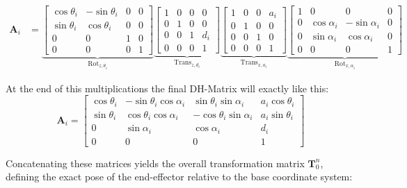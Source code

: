 \documentclass[11pt, a4paper]{article}
\begin{document}
\begin{align*}
\mathbf{A}_i &=\underbrace{
\begin{bmatrix} 
\cos\theta_i & -\sin\theta_i & 0 & 0 \\ 
\sin\theta_i & \cos\theta_i & 0 & 0 \\ 
0 & 0 & 1 & 0 \\ 
0 & 0 & 0 & 1 
\end{bmatrix}}_{\text{Rot}_{z, \theta_i}}
\underbrace{
\begin{bmatrix} 
1 & 0 & 0 & 0 \\ 
0 & 1 & 0 & 0 \\ 
0 & 0 & 1 & d_i \\ 
0 & 0 & 0 & 1 
\end{bmatrix}}_{\text{Trans}_{z, d_i}}
\underbrace{
\begin{bmatrix} 
1 & 0 & 0 & a_i \\ 
0 & 1 & 0 & 0 \\ 
0 & 0 & 1 & 0 \\ 
0 & 0 & 0 & 1 
\end{bmatrix}}_{\text{Trans}_{x, a_i}}
\underbrace{
\begin{bmatrix} 
1 & 0 & 0 & 0 \\ 
0 & \cos\alpha_i & -\sin\alpha_i & 0 \\ 
0 & \sin\alpha_i & \cos\alpha_i & 0 \\ 
0 & 0 & 0 & 1 
\end{bmatrix}}_{\text{Rot}_{x, \alpha_i}}
\end{align*}

At the end of this multiplications the final DH-Matrix will exactly like this:
\begin{equation}
    \mathbf{A}_i = \begin{bmatrix} \cos\theta_i & -\sin\theta_i \cos\alpha_i & \sin\theta_i \sin\alpha_i & a_i \cos\theta_i \\ \sin\theta_i & \cos\theta_i \cos\alpha_i & -\cos\theta_i \sin\alpha_i & a_i \sin\theta_i \\ 0 & \sin\alpha_i & \cos\alpha_i & d_i \\ 0 & 0 & 0 & 1 \end{bmatrix}
\end{equation}

\noindent Concatenating these matrices yields the overall transformation matrix $\mathbf{T}_0^n$, defining the exact pose of the end-effector relative to the base coordinate system:
\end{document}
